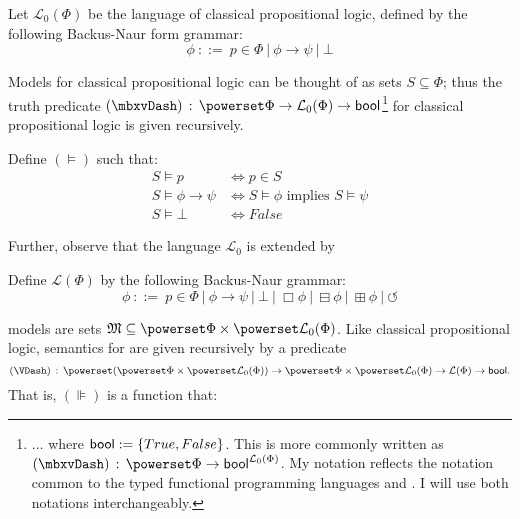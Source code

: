 \begin{definition} Let $\mathcal{L}_0 (\Phi)$ be the language of classical propositional logic, defined by the following Backus-Naur form grammar:
\[ \phi \ {::=} \  p \in \Phi \  | \  \phi
   \rightarrow \psi \  | \  \bot \]
\end{definition}
Models for classical propositional logic can be thought of as sets $S \subseteq \Phi$; thus the truth predicate $(\models) \colons \powerset \Phi \rightarrow \mathcal{L}_0 (\Phi)
\rightarrow \textup{\textsf{bool}}${\footnote{$\ldots$ where $\textup{\textsf{bool}} := \{True, False\}$.  This is more commonly written as
$(\models) \colons \powerset \Phi \rightarrow
\textup{\textsf{bool}}^{\mathcal{L}_0 (\Phi)}$.  My notation reflects
the notation common to the typed functional programming languages
 and . I will use both notations interchangeably.}} for classical propositional logic
is given recursively.  
\begin{definition}
Define $(\models)$ such that:
\begin{align*}
  S{\models}p & {\iff}p{\in}S\\
  S{\models}{\phi}{\rightarrow}{\psi} & {\iff}S{\models}{\phi}\text{ implies
  }S{\models}{\psi}\\
  S{\models}{\bot} & {\iff} False
\end{align*}
\end{definition}
Further, observe that the language $\mathcal{L}_0$ is extended by 
\begin{definition} Define $\mathcal{L} (\Phi)$ by the following Backus-Naur grammar:
\[ \phi \ {::=} \  p \in \Phi \  | \  \phi
   \rightarrow \psi \  | \  \bot \  |
   \  \Box \phi \  | \  \boxminus \phi
   \  | \  \boxplus \phi \  | \ 
   \circlearrowleft \]
\end{definition}
 \tmtextsc{EviL} models are sets $\Omega
\subseteq \powerset \Phi \times \powerset
\mathcal{L}_0 (\Phi)$.  Like classical propositional logic, semantics for
\tmtextsc{EviL} are given recursively by a predicate
\[ (\VDash) \colons \powerset  (\powerset \Phi \times \powerset \mathcal{L}_0 (\Phi)) \rightarrow \powerset \Phi
   \times \powerset \mathcal{L}_0 (\Phi)
   \rightarrow \mathcal{L} (\Phi) \rightarrow
   \textup{\textsf{bool}}. \]
That is, $(\VDash)$ is a function that:
